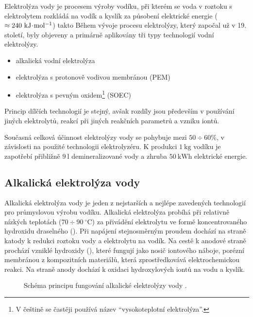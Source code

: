 Elektrolýza vody je procesem výroby vodíku, při kterém se voda v roztoku s elektrolytem rozkládá na vodík a kyslík za působení elektrické energie ($\approx 240\ \mathrm{kJ\!\cdot\! mol^{-1}}$) takto \cite{Kumar2022}
Během vývoje procesu elektrolýzy, který započal už v 19. století, byly objeveny a primárně aplikovány tři typy technologií vodní elektrolýzy. \cite{Kumar2022}
\begin{itemize}[leftmargin=*]
\item alkalická vodní elektrolýza
\item elektrolýza s protonově vodivou membránou (\acs{PEM})
\item elektrolýza s pevným oxidem\footnote{V češtině se častěji používá název \enquote{vysokoteplotní elektrolýza}.} (\acs{SOEC})
\end{itemize}
Princip dílčích technologií je stejný, avšak rozdíly jsou především v používání jiných elektrolytů, reakcí při jiných reakčních parametrů a vzniku iontů. \cite{Kumar2022}

Současná celková účinnost elektrolýzy vody se pohybuje mezi $50 \div 60\%$, v závislosti na použité technologii elektrolyzéru. K produkci $1\ \mathrm{kg}$ vodíku je zapotřebí přibližně $9\ \mathrm{l}$ demineralizované vody a zhruba $50\ \mathrm{kWh}$ elektrické energie. \cite{Hytep}

\subsection{Alkalická elektrolýza vody}

Alkalická elektrolýza vody je jeden z nejstarších a nejlépe zavedených technologií pro průmyslovou výrobu vodíku. Alkalická elektrolýza probíhá při relativně nízkých teplotách ($70\div90\ \mathrm{^{\circ}C}$) za přivádění elektrolytu ve formě koncentrovaného hydroxidu draselného (). Při napájení stejnosměrným proudem dochází na straně katody k redukci roztoku vody a elektrolytu na vodík. Na cestě k anodové straně prochází vzniklé hydroxidy (), které fungují jako nosič iontového náboje, porézní membránou z kompozitních materiálů, která zprostředkovává elektrochemickou reakci. Na straně anody dochází k oxidaci hydroxylových iontů na vodu a kyslík. \cite{Tkac2017,Kumar2022}
\begin{figure}[h]
    \centering
    
    \caption[Schéma principu fungování alkalické elektrolýzy vody]{Schéma principu fungování alkalické elektrolýzy vody \cite{Kumar2022}.} \label{fig:elekt_alk}
\end{figure}

